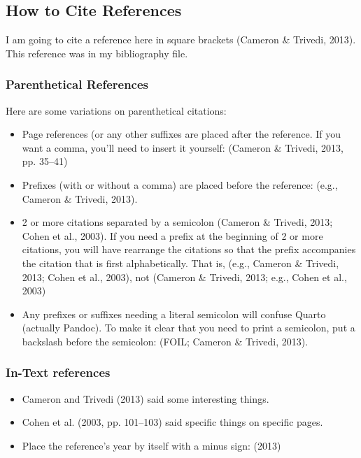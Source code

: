 \documentclass[
  man,
  floatsintext,
  longtable,
  colorlinks=true,linkcolor=blue,citecolor=blue,urlcolor=blue]{apa7}
\begin{document}
\subsection{How to Cite References}\label{how-to-cite-references}

I am going to cite a reference here in square brackets (Cameron \&
Trivedi, 2013). This reference was in my bibliography file.

\subsubsection{Parenthetical References}\label{parenthetical-references}

Here are some variations on parenthetical citations:

\begin{itemize}
\item
  Page references (or any other suffixes are placed after the reference.
  If you want a comma, you'll need to insert it yourself: (Cameron \&
  Trivedi, 2013, pp. 35--41)
\item
  Prefixes (with or without a comma) are placed before the reference:
  (e.g., Cameron \& Trivedi, 2013).
\item
  2 or more citations separated by a semicolon (Cameron \& Trivedi,
  2013; Cohen et al., 2003). If you need a prefix at the beginning of 2
  or more citations, you will have rearrange the citations so that the
  prefix accompanies the citation that is first alphabetically. That is,
  (e.g., Cameron \& Trivedi, 2013; Cohen et al., 2003), not (Cameron \&
  Trivedi, 2013; e.g., Cohen et al., 2003)
\item
  Any prefixes or suffixes needing a literal semicolon will confuse
  Quarto (actually Pandoc). To make it clear that you need to print a
  semicolon, put a backslash before the semicolon: (FOIL; Cameron \&
  Trivedi, 2013).
\end{itemize}

\subsubsection{In-Text references}\label{in-text-references}

\begin{itemize}
\item
  Cameron and Trivedi (2013) said some interesting things.
\item
  Cohen et al. (2003, pp. 101--103) said specific things on specific
  pages.
\item
  Place the reference's year by itself with a minus sign: (2013)
\end{itemize}
\end{document}
